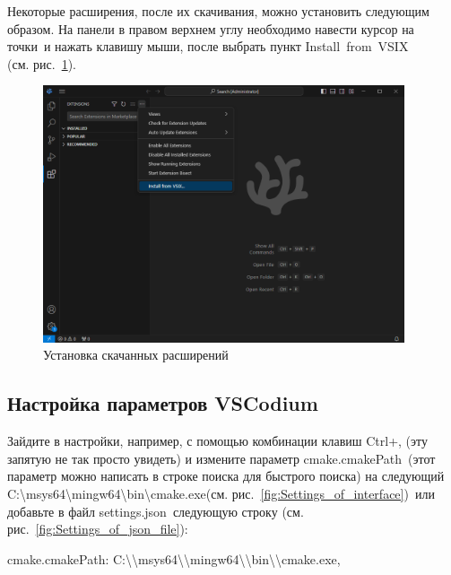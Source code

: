 \documentclass[a4paper,12pt]{article}
\begin{document}
Некоторые расширения, после их скачивания, можно установить следующим образом. На панели в правом верхнем углу необходимо навести курсор на  точки\textquotedbl \ и нажать клавишу мыши, после выбрать пункт \textquotedbl Install~from~VSIX\textquotedbl \\ (см. рис.~\ref{fig:installing_downloaded_extensions}).



\begin{figure}[H]
	\centering
	\includegraphics[width=0.95\textwidth]{images/Installing_downloaded_extensions.png}
	\caption {Установка скачанных расширений}
	\label{fig:installing_downloaded_extensions}
\end{figure}


\subsection{ Настройка параметров VSCodium}

Зайдите в настройки, например, с помощью комбинации клавиш Ctrl+, (эту запятую не так просто увидеть) и измените параметр \textquotedbl cmake.cmakePath\textquotedbl \ (этот параметр можно написать в строке поиска для быстрого поиска) на следующий \textquotedbl C:\textbackslash msys64\textbackslash mingw64\textbackslash bin\textbackslash cmake.exe\textquotedbl (см. рис.~\ref{fig:Settings_of_interface})\ или добавьте в файл \textquotedbl settings.json\textquotedbl \ следующую строку (см. рис.~\ref{fig:Settings_of_json_file}):

\textquotedbl cmake.cmakePath\textquotedbl: \textquotedbl C:\textbackslash\textbackslash msys64\textbackslash\textbackslash mingw64\textbackslash\textbackslash bin\textbackslash\textbackslash cmake.exe\textquotedbl,
\end{document}
